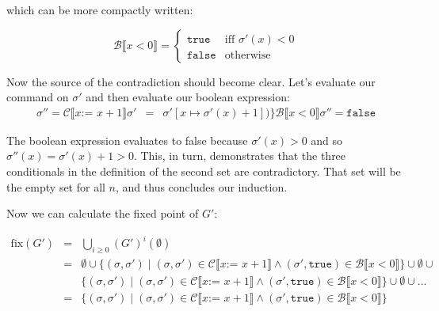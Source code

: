 \documentclass[10pt, oneside]{article}
\begin{document}
\begin{enumerate}[1.]
\begin{enumerate} [(a)]
			which can be more compactly written:
			
			$$\mathcal{B} \llbracket x < 0 \rrbracket = \left \{ 
			  \begin{array}{lr} 
			    \texttt{true}  & \text{iff } \sigma'(x) < 0 \\
			    \texttt{false} & \text{otherwise}
			  \end{array} \right.$$
			    
		  Now the source of the contradiction should become clear. Let's evaluate
		  our command on $\sigma'$ and then evaluate our boolean expression:
			\begin{eqnarray*}
			  \sigma'' = \mathcal{C} \llbracket x \texttt{:= } x + 1 \rrbracket \sigma' & = & \sigma'[x \mapsto \sigma'(x) + 1])\}
			  \mathcal{B} \llbracket x < 0 \rrbracket \sigma'' = \texttt{false}
			\end{eqnarray*}
			
			The boolean expression evaluates to false because $\sigma'(x) > 0$ and so 
			$\sigma''(x) = \sigma'(x) + 1 > 0$. This, in turn, demonstrates that the 
			three conditionals in the definition of the second set are contradictory. 
			That set will be the empty set for all $n$, and thus concludes our induction. \checkmark
			
			\vspace{4mm}
			
			
			Now we can calculate the fixed point of $G'$:
	
			
			\begin{eqnarray*}
			  \text{fix}(G') & = & \bigcup_{i \geq 0} (G')^{i}(\emptyset) \\
			  & = & \emptyset \cup \{ (\sigma, \sigma') \mid (\sigma, \sigma') \in \mathcal{C} \llbracket x \texttt{:= } x + 1 \rrbracket \wedge (\sigma', \texttt{true}) \in \mathcal{B} \llbracket x < 0 \rrbracket \} \cup \emptyset \cup\\
			  & & \{ (\sigma, \sigma') \mid (\sigma, \sigma') \in \mathcal{C} \llbracket x \texttt{:= } x + 1 \rrbracket \wedge (\sigma', \texttt{true}) \in \mathcal{B} \llbracket x < 0 \rrbracket \} \cup \emptyset \cup ... \\
			  & = & \{ (\sigma, \sigma') \mid (\sigma, \sigma') \in \mathcal{C} \llbracket x \texttt{:= } x + 1 \rrbracket \wedge (\sigma', \texttt{true}) \in \mathcal{B} \llbracket x < 0 \rrbracket \} \\
			\end{eqnarray*}
			

\end{enumerate}
\end{enumerate}
\end{document}
